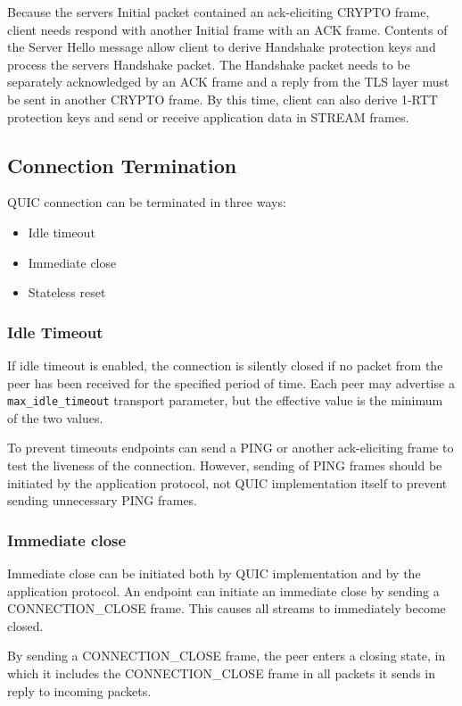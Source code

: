 Because the servers Initial packet contained an ack-eliciting CRYPTO frame, client needs respond
with another Initial frame with an ACK frame. Contents of the Server Hello message allow client to
derive Handshake protection keys and process the servers Handshake packet. The Handshake packet
needs to be separately acknowledged by an ACK frame and a reply from the TLS layer must be sent in
another CRYPTO frame. By this time, client can also derive 1-RTT protection keys and send or receive
application data in STREAM frames.

\subsection{Connection Termination}

QUIC connection can be terminated in three ways:

\begin{itemize}
  \item Idle timeout
  \item Immediate close
  \item Stateless reset
\end{itemize}

\subsubsection{Idle Timeout}

If idle timeout is enabled, the connection is silently closed if no packet from the peer has been
received for the specified period of time. Each peer may advertise a \texttt{max\_idle\_timeout}
transport parameter, but the effective value is the minimum of the two values.

To prevent timeouts endpoints can send a PING or another ack-eliciting frame to test the liveness of
the connection. However, sending of PING frames should be initiated by the application protocol, not
QUIC implementation itself to prevent sending unnecessary PING frames.

\subsubsection{Immediate close}

Immediate close can be initiated both by QUIC implementation and by the application protocol. An
endpoint can initiate an immediate close by sending a CONNECTION\_CLOSE frame. This causes all
streams to immediately become closed.

By sending a CONNECTION\_CLOSE frame, the peer enters a closing state, in which it includes the
CONNECTION\_CLOSE frame in all packets it sends in reply to incoming packets.

